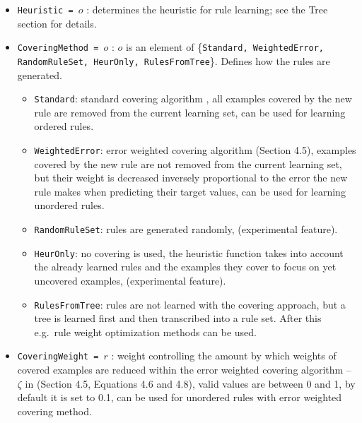 \documentclass[a4paper]{report}
\begin{document}
\begin{itemize}
	\item \texttt{Heuristic = $o$} : determines the heuristic for rule learning; see the Tree section for details.
	\item \texttt{CoveringMethod = $o$} : $o$ is an element of \{\texttt{Standard, %
	WeightedError, %
	RandomRuleSet, %
	HeurOnly, RulesFromTree}\}. Defines how the rules are generated.
	\begin{itemize}
		\item \texttt{Standard}: standard covering algorithm \cite{Michalski1969}, all examples covered by the new rule are removed from the current learning set, can be used for learning ordered rules.
		\item \texttt{WeightedError}: error weighted covering algorithm \cite{Zenko07} (Section 4.5), examples covered by the new rule are not removed from the current learning set, but their weight is decreased inversely proportional to the error the new rule makes when predicting their target values, can be used for learning unordered rules.
		\item \texttt{RandomRuleSet}: rules are generated randomly, (experimental feature).
		\item \texttt{HeurOnly}: no covering is used, the heuristic function takes into account the already learned rules and the examples they cover to focus on yet uncovered examples, (experimental feature).
		\item \texttt{RulesFromTree}: rules are not learned with the covering approach, but a tree is learned first and then transcribed into a rule set. After this e.g.\ rule weight optimization methods can be used.
	\end{itemize}
	\item \texttt{CoveringWeight = $r$} : weight controlling the amount by which weights of covered examples are reduced within the error weighted covering algorithm -- $\zeta$ in \cite{Zenko07} (Section 4.5, Equations 4.6 and 4.8), valid values are between 0 and 1, by default it is set to 0.1, can be used for unordered rules with error weighted covering method.

\end{itemize}
\end{document}
